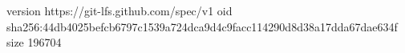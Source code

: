version https://git-lfs.github.com/spec/v1
oid sha256:44db4025befcb6797c1539a724dca9d4c9facc114290d8d38a17dda67dae634f
size 196704
